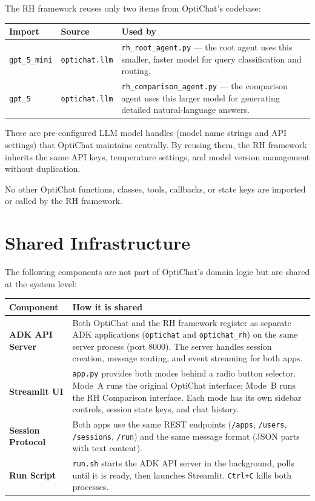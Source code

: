 \documentclass[11pt, a4paper]{article}
\begin{document}
The RH framework reuses only two items from OptiChat's codebase:

\begin{longtable}{p{4cm} p{3cm} p{7cm}}
\toprule
\textbf{Import} & \textbf{Source} & \textbf{Used by} \\
\midrule
\texttt{gpt\_5\_mini} & \texttt{optichat.llm} &
    \texttt{rh\_root\_agent.py} --- the root agent uses this smaller, faster
    model for query classification and routing. \\
\midrule
\texttt{gpt\_5} & \texttt{optichat.llm} &
    \texttt{rh\_comparison\_agent.py} --- the comparison agent uses this
    larger model for generating detailed natural-language answers. \\
\bottomrule
\end{longtable}

These are pre-configured LLM model handles (model name strings and API
settings) that OptiChat maintains centrally.  By reusing them, the RH
framework inherits the same API keys, temperature settings, and model
version management without duplication.

No other OptiChat functions, classes, tools, callbacks, or state keys
are imported or called by the RH framework.


\section{Shared Infrastructure}
\label{sec:shared}

The following components are not part of OptiChat's domain logic but are
shared at the system level:

\begin{longtable}{p{4cm} p{10cm}}
\toprule
\textbf{Component} & \textbf{How it is shared} \\
\midrule
\textbf{ADK API Server} &
    Both OptiChat and the RH framework register as separate ADK applications
    (\texttt{optichat} and \texttt{optichat\_rh}) on the same server process
    (port 8000).  The server handles session creation, message routing, and
    event streaming for both apps. \\
\midrule
\textbf{Streamlit UI} &
    \texttt{app.py} provides both modes behind a radio button selector.
    Mode~A runs the original OptiChat interface; Mode~B runs the RH
    Comparison interface.  Each mode has its own sidebar controls, session
    state keys, and chat history. \\
\midrule
\textbf{Session Protocol} &
    Both apps use the same REST endpoints (\texttt{/apps}, \texttt{/users},
    \texttt{/sessions}, \texttt{/run}) and the same message format
    (JSON parts with text content). \\
\midrule
\textbf{Run Script} &
    \texttt{run.sh} starts the ADK API server in the background, polls
    until it is ready, then launches Streamlit. \texttt{Ctrl+C} kills both
    processes. \\
\bottomrule
\end{longtable}
\end{document}
